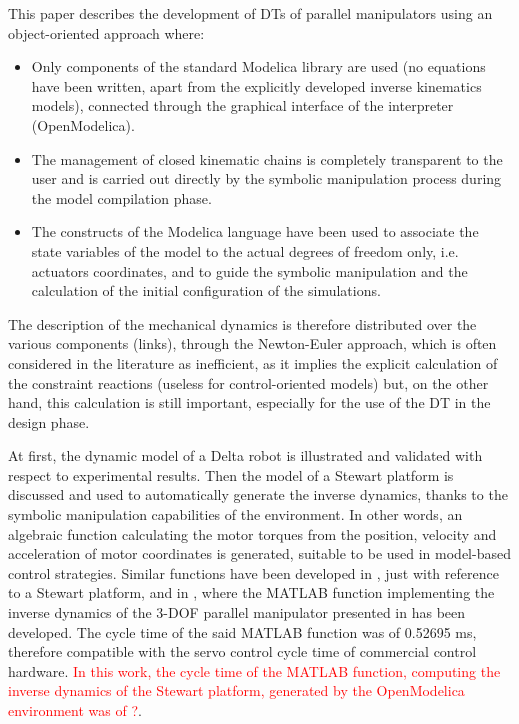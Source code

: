 \documentclass[]{interact}
\theoremstyle{plain}%
\theoremstyle{definition}
\theoremstyle{remark}
\begin{document}
This paper describes the development of DTs of parallel manipulators using an object-oriented approach where:
\begin{itemize}
  \item Only components of the standard Modelica library are used (no equations have been written, apart from the explicitly developed inverse kinematics models), connected through the graphical interface of the interpreter (OpenModelica).
  \item The management of closed kinematic chains is completely transparent to the user and is carried out directly by the symbolic manipulation process during the model compilation phase.
  \item The constructs of the Modelica language have been used to associate the state variables of the model to the actual degrees of freedom only, i.e. actuators coordinates, and to guide the symbolic manipulation and the calculation of the initial configuration of the simulations.
\end{itemize}
The description of the mechanical dynamics is therefore distributed over the various components (links), through the Newton-Euler approach, which is often considered in the literature as inefficient, as it implies the explicit calculation of the constraint reactions (useless for control-oriented models) but, on the other hand, this calculation is still important, especially for the use of the DT in the design phase.

At first, the dynamic model of a Delta robot is illustrated and validated with respect to experimental results. Then the model of a Stewart platform is discussed and used to automatically generate the inverse dynamics, thanks to the symbolic manipulation capabilities of the environment. In other words, an algebraic function calculating the motor torques from the position, velocity and acceleration of motor coordinates is generated, suitable to be used in model-based control strategies. Similar functions have been developed in \cite{HZZ2020}, just with reference to a Stewart platform, and in \cite{XDZ16}, where the MATLAB function implementing the inverse dynamics of the 3-DOF parallel manipulator presented in \cite{1435489} has been developed. The cycle time of the said MATLAB function was of 0.52695 ms, therefore compatible with the servo control cycle time of commercial control hardware. \textcolor{red}{In this work, the cycle time of the MATLAB function, computing the inverse dynamics of the Stewart platform, generated by the OpenModelica environment was of ?}.
\end{document}
